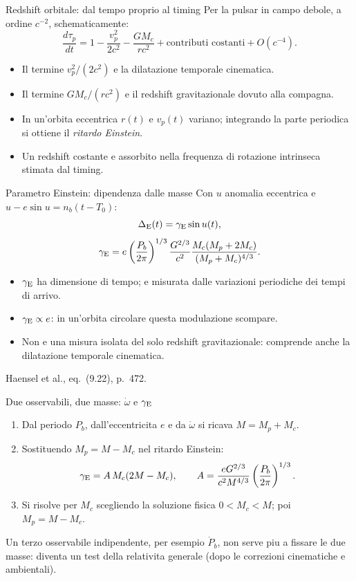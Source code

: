 \begin{frame}[t]{Redshift orbitale: dal tempo proprio al timing}
\small
Per la pulsar in campo debole, a ordine $c^{-2}$, schematicamente:
\[
\frac{d\tau_p}{dt}=1-\frac{v_p^2}{2c^2}-\frac{GM_c}{rc^2}
+\text{contributi costanti}+O(c^{-4}).
\]
\begin{itemize}
\item Il termine $v_p^2/(2c^2)$ e la dilatazione temporale cinematica.
\item Il termine $GM_c/(rc^2)$ e il redshift gravitazionale dovuto alla compagna.
\item In un'orbita eccentrica $r(t)$ e $v_p(t)$ variano; integrando la parte periodica si ottiene il \emph{ritardo Einstein}.
\item Un redshift costante e assorbito nella frequenza di rotazione intrinseca stimata dal timing.
\end{itemize}
\end{frame}

\begin{frame}[t]{Parametro Einstein: dipendenza dalle masse}
\small
Con $u$ anomalia eccentrica e $u-e\sin u=n_b(t-T_0)$:
\[
\Delta_{\rm E}(t)=\gamma_{\rm E}\sin u(t),
\]
\[
\gamma_{\rm E}=e\left(\frac{P_b}{2\pi}\right)^{1/3}
\frac{G^{2/3}}{c^2}
\frac{M_c(M_p+2M_c)}{(M_p+M_c)^{4/3}}.
\]
\begin{itemize}
\item $\gamma_{\rm E}$ ha dimensione di tempo; e misurata dalle variazioni periodiche dei tempi di arrivo.
\item $\gamma_{\rm E}\propto e$: in un'orbita circolare questa modulazione scompare.
\item Non e una misura isolata del solo redshift gravitazionale: comprende anche la dilatazione temporale cinematica.
\end{itemize}
\medskip\footnotesize Haensel et al., eq.~(9.22), p.~472.
\end{frame}

\begin{frame}[t]{Due osservabili, due masse: $\dot\omega$ e $\gamma_{\rm E}$}
\small
\begin{enumerate}
\item Dal periodo $P_b$, dall'eccentricita $e$ e da $\dot\omega$ si ricava $M=M_p+M_c$.
\item Sostituendo $M_p=M-M_c$ nel ritardo Einstein:
\[
\gamma_{\rm E}=A\,M_c(2M-M_c),\qquad
A=\frac{eG^{2/3}}{c^2M^{4/3}}\left(\frac{P_b}{2\pi}\right)^{1/3}.
\]
\item Si risolve per $M_c$ scegliendo la soluzione fisica $0<M_c<M$; poi $M_p=M-M_c$.
\end{enumerate}
\medskip
Un terzo osservabile indipendente, per esempio $\dot P_b$, non serve piu a fissare le due masse: diventa un test della relativita generale (dopo le correzioni cinematiche e ambientali).
\end{frame}

